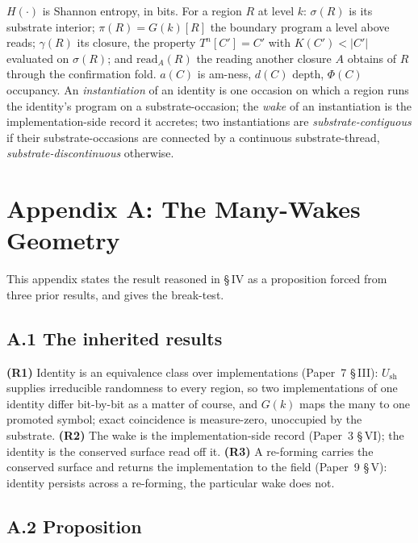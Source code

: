 \documentclass[11pt,oneside]{report}
\theoremstyle{definition}
\theoremstyle{remark}
\begin{document}
\ensuremath{H(\cdot)} is Shannon entropy, in bits. For a region \ensuremath{R} at level \ensuremath{k}: \ensuremath{\sigma(R)} is its substrate interior; \ensuremath{\pi(R) = G(k)[R]} the boundary program a level above reads; \ensuremath{\gamma(R)} its closure, the property \ensuremath{T^{n}[C'] = C'} with \ensuremath{K(C') < |C'|} evaluated on \ensuremath{\sigma(R)}; and \ensuremath{\mathrm{read}_A(R)} the reading another closure \ensuremath{A} obtains of \ensuremath{R} through the confirmation fold. \ensuremath{a(C)} is am-ness, \ensuremath{d(C)} depth, \ensuremath{\Phi(C)} occupancy. An \emph{instantiation} of an identity is one occasion on which a region runs the identity's program on a substrate-occasion; the \emph{wake} of an instantiation is the implementation-side record it accretes; two instantiations are \emph{substrate-contiguous} if their substrate-occasions are connected by a continuous substrate-thread, \emph{substrate-discontinuous} otherwise.

\section*{Appendix A: The Many-Wakes Geometry}

This appendix states the result reasoned in \S\,IV as a proposition forced from three prior results, and gives the break-test.

\subsection*{A.1 The inherited results}

\textbf{(R1)} Identity is an equivalence class over implementations (Paper~7 \S\,III): \ensuremath{U_{\mathrm{sh}}} supplies irreducible randomness to every region, so two implementations of one identity differ bit-by-bit as a matter of course, and \ensuremath{G(k)} maps the many to one promoted symbol; exact coincidence is measure-zero, unoccupied by the substrate. \textbf{(R2)} The wake is the implementation-side record (Paper~3 \S\,VI); the identity is the conserved surface read off it. \textbf{(R3)} A re-forming carries the conserved surface and returns the implementation to the field (Paper~9 \S\,V): identity persists across a re-forming, the particular wake does not.

\subsection*{A.2 Proposition}
\end{document}
